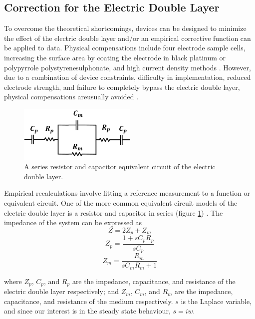 \subsection{Correction for the Electric Double Layer}

\par To overcome the theoretical shortcomings, devices can be designed to minimize the effect of the electric double layer and/or an empirical corrective function can be applied to data. Physical compensations include four electrode sample cells, increasing the surface area by coating the electrode in black platinum or polypyrrole polystyrenesulphonate, and high current density methods \cite{ishai_electrode_2013}. However, due to a combination of device constraints, difficulty in implementation, reduced electrode strength, and failure to completely bypass the electric double layer, physical compensations areusually avoided \cite{ishai_assessment_2012}. 

\begin{figure}
    \centering
    \includegraphics[width=0.5\textwidth]{images/edl_cap_equiv.png}
    \caption{A series resistor and capacitor equivalent circuit of the electric double layer.}
    \label{fig:edl_cap_equiv}
\end{figure}

\par Empirical recalculations involve fitting a reference measurement to a function or equivalent circuit. One of the more common equivalent circuit models of the electric double layer is a resistor and capacitor in series (figure \ref{fig:edl_cap_equiv}) \cite{feldman_fractal-polarization_1998}. The impedance of the system can be expressed as
\begin{equation}[h]
    Z = 2Z_p + Z_m
\end{equation}
\begin{equation}
    Z_p = \frac{1 + sC_pR_p}{sC_p}
\end{equation}
\begin{equation}
    Z_m = \frac{R_m}{sC_mR_m+1}
\end{equation}

\noindent where $Z_p$, $C_p$, and $R_p$ are the impedance, capacitance, and resistance of the electric double layer respectively; and $Z_m$, $C_m$, and $R_m$ are the impedance, capacitance, and resistance of the medium respectively. $s$ is the Laplace variable, and since our interest is in the steady state behaviour, $s = iw$.

